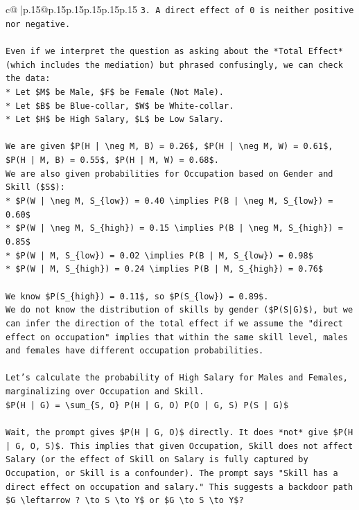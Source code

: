\documentclass{article}
\begin{document}
{\begin{supertabular}{c@{$\;$}|p{.15\linewidth}@{}p{.15\linewidth}p{.15\linewidth}p{.15\linewidth}p{.15\linewidth}p{.15\linewidth}}
{{{\texttt{3.  A direct effect of 0 is neither positive nor negative.} \\
\\ 
\texttt{Even if we interpret the question as asking about the *Total Effect* (which includes the mediation) but phrased confusingly, we can check the data:} \\
\texttt{*   Let \$M\$ be Male, \$F\$ be Female (Not Male).} \\
\texttt{*   Let \$B\$ be Blue{-}collar, \$W\$ be White{-}collar.} \\
\texttt{*   Let \$H\$ be High Salary, \$L\$ be Low Salary.} \\
\\ 
\texttt{We are given \$P(H | \textbackslash{}neg M, B) = 0.26\$, \$P(H | \textbackslash{}neg M, W) = 0.61\$, \$P(H | M, B) = 0.55\$, \$P(H | M, W) = 0.68\$.} \\
\texttt{We are also given probabilities for Occupation based on Gender and Skill (\$S\$):} \\
\texttt{*   \$P(W | \textbackslash{}neg M, S\_\{low\}) = 0.40 \textbackslash{}implies P(B | \textbackslash{}neg M, S\_\{low\}) = 0.60\$} \\
\texttt{*   \$P(W | \textbackslash{}neg M, S\_\{high\}) = 0.15 \textbackslash{}implies P(B | \textbackslash{}neg M, S\_\{high\}) = 0.85\$} \\
\texttt{*   \$P(W | M, S\_\{low\}) = 0.02 \textbackslash{}implies P(B | M, S\_\{low\}) = 0.98\$} \\
\texttt{*   \$P(W | M, S\_\{high\}) = 0.24 \textbackslash{}implies P(B | M, S\_\{high\}) = 0.76\$} \\
\\ 
\texttt{We know \$P(S\_\{high\}) = 0.11\$, so \$P(S\_\{low\}) = 0.89\$.} \\
\texttt{We do not know the distribution of skills by gender (\$P(S|G)\$), but we can infer the direction of the total effect if we assume the "direct effect on occupation" implies that within the same skill level, males and females have different occupation probabilities.} \\
\\ 
\texttt{Let's calculate the probability of High Salary for Males and Females, marginalizing over Occupation and Skill.} \\
\texttt{\$P(H | G) = \textbackslash{}sum\_\{S, O\} P(H | G, O) P(O | G, S) P(S | G)\$} \\
\\ 
\texttt{Wait, the prompt gives \$P(H | G, O)\$ directly. It does *not* give \$P(H | G, O, S)\$. This implies that given Occupation, Skill does not affect Salary (or the effect of Skill on Salary is fully captured by Occupation, or Skill is a confounder). The prompt says "Skill has a direct effect on occupation and salary." This suggests a backdoor path \$G \textbackslash{}leftarrow ? \textbackslash{}to S \textbackslash{}to Y\$ or \$G \textbackslash{}to S \textbackslash{}to Y\$?} \\
}}}
\end{supertabular}}
\end{document}
